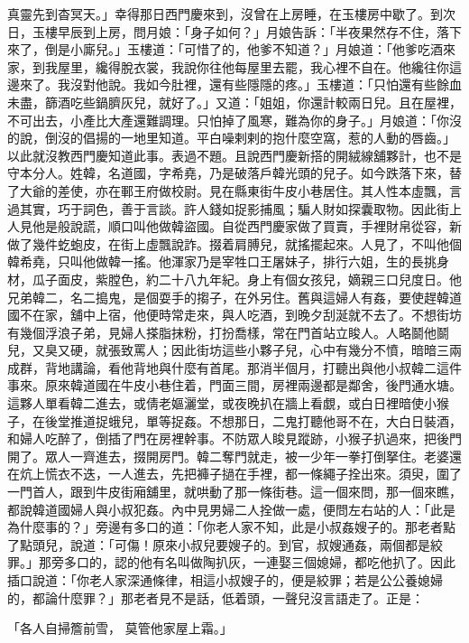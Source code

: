 \begin{showcontents}{}
真靈先到杳冥天。」幸得那日西門慶來到，沒曾在上房睡，在玉樓房中歇了。到次日，玉樓早辰到上房，問月娘：「身子如何？」月娘告訴：「半夜果然存不住，落下來了，倒是小廝兒。」玉樓道：「可惜了的，他爹不知道？」月娘道：「他爹吃酒來家，到我屋里，纔得脫衣裳，我說你往他每屋里去罷，我心裡不自在。他纔往你這邊來了。我沒對他說。我如今肚裡，還有些隱隱的疼。」玉樓道：「只怕還有些餘血未盡，篩酒吃些鍋臍灰兒，就好了。」又道：「姐姐，你還計較兩日兒。且在屋裡，不可出去，小產比大產還難調理。只怕掉了風寒，難為你的身子。」月娘道：「你沒的說，倒沒的倡揚的一地里知道。平白噪剌剌的抱什麼空窩，惹的人動的唇齒。」以此就沒教西門慶知道此事。表過不題。且說西門慶新搭的開絨線舖夥計，也不是守本分人。姓韓，名道國，字希堯，乃是破落戶韓光頭的兒子。如今跌落下來，替了大爺的差使，亦在鄆王府做校尉。見在縣東街牛皮小巷居住。其人性本虛飄，言過其實，巧于詞色，善于言談。許人錢如捉影捕風；騙人財如探囊取物。因此街上人見他是般說謊，順口叫他做韓盜國。自從西門慶家做了買賣，手裡財帛從容，新做了幾件虼蚫皮，在街上虛飄說詐。掇着肩膊兒，就搖擺起來。人見了，不叫他個韓希堯，只叫他做韓一搖。他渾家乃是宰牲口王屠妹子，排行六姐，生的長挑身材，瓜子面皮，紫膛色，約二十八九年紀。身上有個女孩兒，嫡親三口兒度日。他兄弟韓二，名二搗鬼，是個耍手的搊子，在外另住。舊與這婦人有姦，要使趕韓道國不在家，舖中上宿，他便時常走來，與人吃酒，到晚夕刮涎就不去了。不想街坊有幾個浮浪子弟，見婦人搽脂抹粉，打扮喬樣，常在門首站立睃人。人略鬬他鬬兒，又臭又硬，就張致罵人；因此街坊這些小夥子兒，心中有幾分不憤，暗暗三兩成群，背地講論，看他背地與什麼有首尾。那消半個月，打聽出與他小叔韓二這件事來。原來韓道國在牛皮小巷住着，門面三間，房裡兩邊都是鄰舍，後門通水塘。這夥人單看韓二進去，或倩老嫗灑堂，或夜晚扒在牆上看覷，或白日裡暗使小猴子，在後堂推道捉蛾兒，單等捉姦。不想那日，二鬼打聽他哥不在，大白日裝酒，和婦人吃醉了，倒插了門在房裡幹事。不防眾人睃見蹤跡，小猴子扒過來，把後門開了。眾人一齊進去，掇開房門。韓二奪門就走，被一少年一拳打倒拏住。老婆還在炕上慌衣不迭，一人進去，先把褲子撾在手裡，都一條繩子拴出來。須臾，圍了一門首人，跟到牛皮街廂舖里，就哄動了那一條街巷。這一個來問，那一個來瞧，都說韓道國婦人與小叔犯姦。內中見男婦二人拴做一處，便問左右站的人：「此是為什麼事的？」旁邊有多口的道：「你老人家不知，此是小叔姦嫂子的。那老者點了點頭兒，說道：「可傷！原來小叔兒要嫂子的。到官，叔嫂通姦，兩個都是絞罪。」那旁多口的，認的他有名叫做陶扒灰，一連娶三個媳婦，都吃他扒了。因此插口說道：「你老人家深通條律，相這小叔嫂子的，便是絞罪；若是公公養媳婦的，都論什麼罪？」那老者見不是話，低着頭，一聲兒沒言語走了。正是：

「各人自掃簷前雪，  莫管他家屋上霜。」


\end{showcontents}
